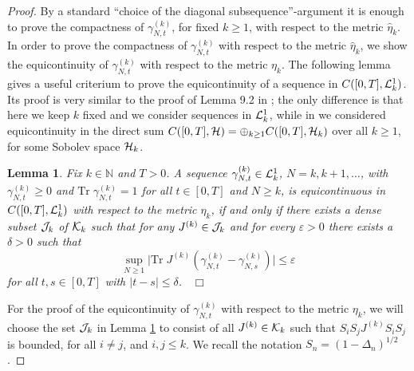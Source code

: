 \documentclass[11pt]{article}
\newtheorem{lemma}[theorem]{Lemma}
\newcommand{\eps}{\varepsilon}
\newcommand{\bN}{{\mathbb N}}
\newcommand{\tr}{\mbox{Tr}}
\newcommand{\wh}{\widehat}
\newcommand{\cK}{{\cal K}}
\newcommand{\cH}{{\cal H}}
\newcommand{\cL}{{\cal L}}
\newcommand{\cJ}{{\cal J}}
\begin{document}
\begin{proof}
By a standard ``choice of the diagonal subsequence''-argument it is
enough to prove the compactness of $ \gamma_{N,t}^{(k)}$, for fixed
$k \geq 1$, with respect to the metric $\wh \eta_k$. In order to
prove the compactness of $ \gamma_{N,t}^{(k)}$ with respect to the
metric $\wh \eta_k$, we show the equicontinuity of
$\gamma_{N,t}^{(k)}$ with respect to the metric $\eta_k$.
The following lemma gives a useful criterium to prove the
equicontinuity of a sequence in $ C([0,T],
\cL^1_k)$. Its proof is very similar to the proof of Lemma 9.2 in
\cite{ESY}; the only difference is that here we keep $k$ fixed and
we consider sequences in $\cL^1_k$, while in \cite{ESY} we
considered equicontinuity in the direct sum $C([0,T], \cH) =
\oplus_{k \geq 1} C([0,T], \cH_k)$ over all $k \geq 1$, for some
Sobolev space $\cH_k$.


\begin{lemma}\label{lm:equi}  Fix $k \in \bN$ and $T > 0$.
A sequence $\gamma_{N, t}^{(k)} \in \cL^1_k$, $N=k,k+1, \ldots$,
with $\gamma_{N,t}^{(k)} \geq 0$ and $\tr \; \gamma_{N,t}^{(k)} = 1$
for all $t \in [0,T]$ and $N \geq k$, is equicontinuous in $C([0,T],
\cL^1_k)$ with respect to the metric $\eta_k$, if and only if there
exists a dense subset $\cJ_k$ of $\cK_k$ such that for any
$J^{(k)}\in \cJ_k$ and for every $\eps
>0$ there exists a $\delta > 0$ such that
\begin{equation}\label{eq:equi02}
\sup_{N\ge 1}\Big| \tr \;  J^{(k)} \left( \gamma_{N,t}^{(k)} -
\gamma_{N,s}^{(k)} \right) \Big| \leq \eps
\end{equation}
for all $t,s \in [0,T]$ with $|t -s| \leq \delta$. $\;\;\Box$
\end{lemma}




\medskip

For the proof of the equicontinuity of
$\gamma_{N,t}^{(k)}$ with respect to the metric $\eta_k$, we will
choose the set $\cJ_k$ in Lemma \ref{lm:equi} to
consist of all $J^{(k)} \in \cK_k$ such that $S_i S_j
J^{(k)} S_i S_j$ is bounded, for all $i \neq j$, and $i,j \leq k$.
We recall the notation
 $S_n = (1-\Delta_n)^{1/2}$.




\end{proof}
\end{document}
